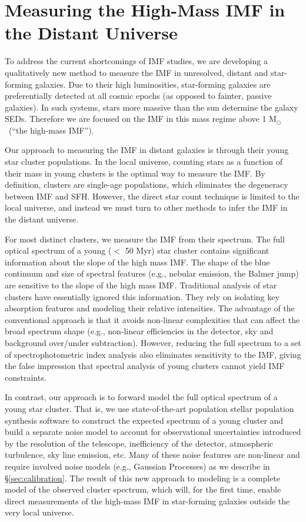 \documentclass[11pt,preprint]{aastex}
\providecommand{\msun}{M$_\odot$~}
\begin{document}
\section{Measuring the High-Mass IMF in the Distant Universe}

To address the current shortcomings of IMF studies, we are developing a qualitatively new method to measure the IMF in unresolved, distant and star-forming galaxies.  Due to their high luminosities, star-forming galaxies are preferentially detected at all cosmic epochs (as opposed to fainter, passive galaxies).  In such systems, stars more massive than the sun determine the galaxy SEDs. Therefore we are focused on the IMF in this mass regime above 1 \msun (``the high-mass IMF'').

Our approach to measuring the IMF in distant galaxies is through their young star cluster populations. In the local universe, counting stars as a function of their mass in young clusters is the optimal way to measure the IMF.  By definition, clusters are single-age populations, which eliminates the degeneracy between IMF and SFH.  However, the direct star count technique is limited to the local universe, and instead we must turn to other methods to infer the IMF in the distant universe.  

For most distinct clusters, we measure the IMF from their spectrum.  The full optical spectrum of a young ($<$ 50 Myr) star cluster contains significant information about the slope of the high mass IMF.  The shape of the blue continuum and size of spectral features (e.g., nebular emission, the Balmer jump) are sensitive to the slope of the high mass IMF. Traditional analysis of star clusters have essentially ignored this information.  They rely on isolating key absorption features and modeling their relative intensities.  The advantage of the conventional approach is that it avoids non-linear complexities that can affect the broad spectrum shape (e.g., non-linear efficiencies in the detector,  sky and background over/under subtraction).  However, reducing the full spectrum to a set of spectrophotometric index analysis also eliminates sensitivity to the IMF\citep[e.g.,][]{koleva2008}, giving the false impression that spectral analysis of young clusters cannot yield IMF constraints.

In contrast, our approach is to forward model the full optical spectrum of a young star cluster.  That is, we use state-of-the-art population stellar population synthesis software to construct the expected spectrum of a young cluster and build a separate noise model to account for observational uncertainties introduced by the resolution of the telescope, inefficiency of the detector, atmospheric turbulence, sky line emission, etc.  Many of these noise features are non-linear and require involved noise models (e.g., Gaussian Processes) as we describe in \S \ref{sec:calibration}.  The result of this new approach to modeling is a complete model of the observed cluster spectrum, which will, for the first time, enable direct measurements of the high-mass IMF in star-forming galaxies outside the very local universe.  
\end{document}
